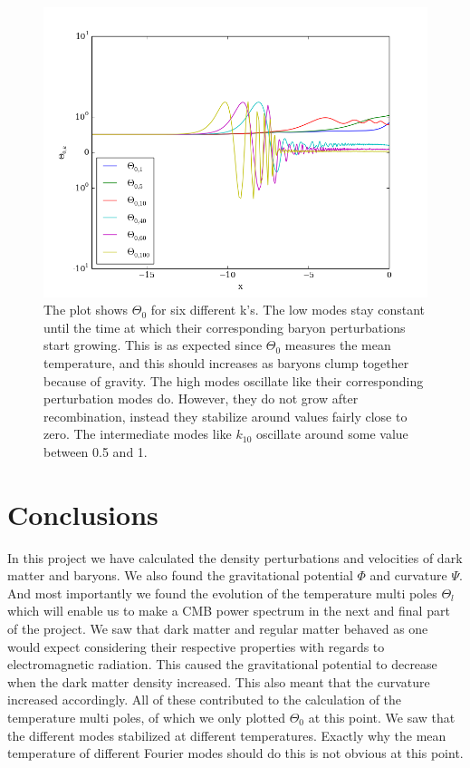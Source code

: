 \documentclass[a4paper]{report}
\begin{document}
\begin{figure}[ht]
\end{figure}

\begin{figure}[ht]
 \includegraphics[width=\textwidth]{Theta0.png}
 \caption{The plot shows $\Theta_0$ for six different k's. The low modes stay constant until the time at which their corresponding baryon perturbations start growing. This is as expected since $\Theta_0$ measures the mean temperature, and this should increases as baryons clump together because of gravity. The high modes oscillate like their corresponding perturbation modes do. However, they do not grow after recombination, instead they stabilize around values fairly close to zero. The intermediate modes like $k_{10}$ oscillate around some value between 0.5 and 1.}
 \label{fig:Theta0}
\end{figure}

\section{Conclusions} \label{sec:conclusions}
In this project we have calculated the density perturbations and velocities of dark matter and baryons. We also found the gravitational potential $\Phi$ and curvature $\Psi$. And most importantly we found the evolution of the temperature multi poles $\Theta_l$ which will enable us to make a CMB power spectrum in the next and final part of the project. We saw that dark matter and regular matter behaved as one would expect considering their respective properties with regards to electromagnetic radiation. This caused the gravitational potential to decrease when the dark matter density increased. This also meant that the curvature increased accordingly. All of these contributed to the calculation of the temperature multi poles, of which we only plotted $\Theta_0$ at this point. We saw that the different modes stabilized at different temperatures. Exactly why the mean temperature of different Fourier modes should do this is not obvious at this point.
\end{document}
